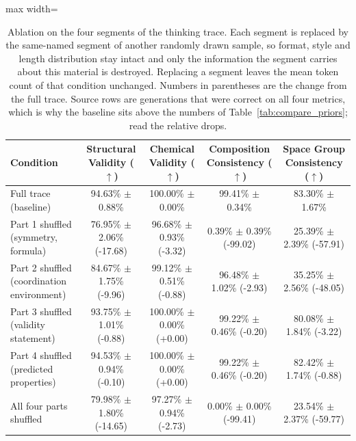 \begin{table}[t]
\centering
\caption{Ablation on the four segments of the thinking trace. Each segment is replaced by the same-named segment of another randomly drawn sample, so format, style and length distribution stay intact and only the information the segment carries about this material is destroyed. Replacing a segment leaves the mean token count of that condition unchanged. Numbers in parentheses are the change from the full trace. Source rows are generations that were correct on all four metrics, which is why the baseline sits above the numbers of Table~\ref{tab:compare_priors}; read the relative drops.}
\label{tab:trace_shuffle}
\small
\begin{adjustbox}{max width=\linewidth}
\begin{tabular}{@{}lcccc@{}}
\toprule
\textbf{Condition} & \textbf{Structural Validity} ($\uparrow$) & \textbf{Chemical Validity} ($\uparrow$) & \textbf{Composition Consistency} ($\uparrow$) & \textbf{Space Group Consistency} ($\uparrow$) \\
\midrule
Full trace (baseline) & 94.63\% $\pm$ 0.88\% & 100.00\% $\pm$ 0.00\% & 99.41\% $\pm$ 0.34\% & 83.30\% $\pm$ 1.67\% \\
\midrule
Part 1 shuffled (symmetry, formula) & 76.95\% $\pm$ 2.06\% (-17.68) & 96.68\% $\pm$ 0.93\% (-3.32) & 0.39\% $\pm$ 0.39\% (-99.02) & 25.39\% $\pm$ 2.39\% (-57.91) \\
Part 2 shuffled (coordination environment) & 84.67\% $\pm$ 1.75\% (-9.96) & 99.12\% $\pm$ 0.51\% (-0.88) & 96.48\% $\pm$ 1.02\% (-2.93) & 35.25\% $\pm$ 2.56\% (-48.05) \\
Part 3 shuffled (validity statement) & 93.75\% $\pm$ 1.01\% (-0.88) & 100.00\% $\pm$ 0.00\% (+0.00) & 99.22\% $\pm$ 0.46\% (-0.20) & 80.08\% $\pm$ 1.84\% (-3.22) \\
Part 4 shuffled (predicted properties) & 94.53\% $\pm$ 0.94\% (-0.10) & 100.00\% $\pm$ 0.00\% (+0.00) & 99.22\% $\pm$ 0.46\% (-0.20) & 82.42\% $\pm$ 1.74\% (-0.88) \\
All four parts shuffled & 79.98\% $\pm$ 1.80\% (-14.65) & 97.27\% $\pm$ 0.94\% (-2.73) & 0.00\% $\pm$ 0.00\% (-99.41) & 23.54\% $\pm$ 2.37\% (-59.77) \\
\bottomrule
\end{tabular}
\end{adjustbox}
\end{table}
